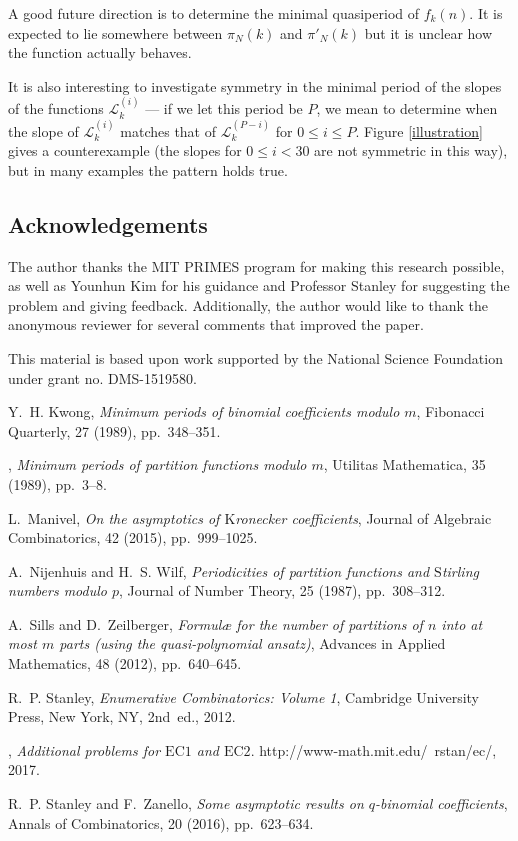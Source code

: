\documentclass[12pt]{article}
\begin{document}
A good future direction is to determine the minimal quasiperiod of $f_{k}(n)$. It is expected to lie somewhere between $\pi_N(k)$ and $\pi'_N(k)$ but it is unclear how the function actually behaves.

It is also interesting to investigate symmetry in the minimal period of the slopes of the functions $\mathcal{L}_{k}^{(i)}$ --- if we let this period be $P$, we mean to determine when the slope of $\mathcal{L}_{k}^{(i)}$ matches that of $\mathcal{L}_{k}^{(P-i)}$ for $0\le i \le P$. Figure \ref{illustration} gives a counterexample (the slopes for $0\le i < 30$ are not symmetric in this way), but in many examples the pattern holds true.

\subsection*{Acknowledgements}

The author thanks the MIT PRIMES program for making this research possible, as well as Younhun Kim for his guidance and Professor Stanley for suggesting the problem and giving feedback. Additionally, the author would like to thank the anonymous reviewer for several comments that improved the paper. 

This material is based upon work supported by the National Science Foundation under grant no. DMS-1519580.

\begin{thebibliography}{1}

{\sc Y.~H. Kwong}, {\em Minimum periods of binomial coefficients modulo $m$},
  Fibonacci Quarterly, 27 (1989), pp.~348--351.

\leavevmode\vrule height 2pt depth -1.6pt width 23pt, {\em Minimum periods of
  partition functions modulo $m$}, Utilitas Mathematica, 35 (1989), pp.~3--8.

{\sc L.~Manivel}, {\em On the asymptotics of $\text{K}$ronecker coefficients},
  Journal of Algebraic Combinatorics, 42 (2015), pp.~999--1025.

{\sc A.~Nijenhuis and H.~S. Wilf}, {\em Periodicities of partition functions
  and $\text{S}$tirling numbers modulo $p$}, Journal of Number Theory, 25
  (1987), pp.~308--312.

{\sc A.~Sills and D.~Zeilberger}, {\em Formul{\ae} for the number of partitions
  of $n$ into at most $m$ parts (using the quasi-polynomial ansatz)}, Advances
  in Applied Mathematics, 48 (2012), pp.~640--645.

{\sc R.~P. Stanley}, {\em Enumerative Combinatorics: Volume 1}, Cambridge
  University Press, New York, NY, 2nd~ed., 2012.

\leavevmode\vrule height 2pt depth -1.6pt width 23pt, {\em Additional problems
  for $\text{EC1}$ and $\text{EC2}$}.
\newblock http://www-math.mit.edu/~rstan/ec/, 2017.

{\sc R.~P. Stanley and F.~Zanello}, {\em Some asymptotic results on
  $q$-binomial coefficients}, Annals of Combinatorics, 20 (2016), pp.~623--634.

\end{thebibliography}
\end{document}
